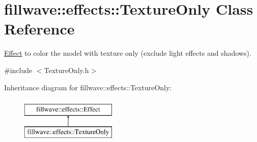 \hypertarget{classfillwave_1_1effects_1_1TextureOnly}{}\section{fillwave\+:\+:effects\+:\+:Texture\+Only Class Reference}
\label{classfillwave_1_1effects_1_1TextureOnly}


\hyperlink{classfillwave_1_1effects_1_1Effect}{Effect} to color the model with texture only (exclude light effects and shadows).  




{\ttfamily \#include $<$Texture\+Only.\+h$>$}

Inheritance diagram for fillwave\+:\+:effects\+:\+:Texture\+Only\+:\begin{figure}[H]
\begin{center}
\leavevmode
\includegraphics[height=2.000000cm]{classfillwave_1_1effects_1_1TextureOnly}
\end{center}
\end{figure}
